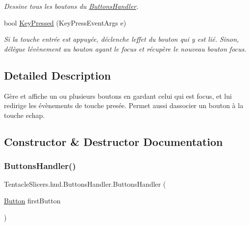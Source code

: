 \begin{DoxyCompactItemize}
\begin{DoxyCompactList}\small\item\em Dessine tous les boutons du \hyperlink{class_tentacle_slicers_1_1hud_1_1_buttons_handler}{Buttons\+Handler}. \end{DoxyCompactList}\item 
bool \hyperlink{class_tentacle_slicers_1_1hud_1_1_buttons_handler_abab8bf40df88c7cd220d591425c151b5}{Key\+Pressed} (Key\+Press\+Event\+Args e)
\begin{DoxyCompactList}\small\item\em Si la touche entrée est appuyée, déclenche l\textquotesingle{}effet du bouton qui y est lié. Sinon, délègue l\textquotesingle{}évènement au bouton ayant le focus et récupère le nouveau bouton focus. \end{DoxyCompactList}\end{DoxyCompactItemize}


\subsection{Detailed Description}
Gère et affiche un ou plusieurs boutons en gardant celui qui est focus, et lui redirige les évènements de touche presée. Permet aussi d\textquotesingle{}associer un bouton à la touche echap. 



\subsection{Constructor \& Destructor Documentation}
\mbox{\label{class_tentacle_slicers_1_1hud_1_1_buttons_handler_a9f5cc9dac18041a013f0bf37d88dee25}} 
\subsubsection{\texorpdfstring{Buttons\+Handler()}{ButtonsHandler()}}
{\footnotesize\ttfamily Tentacle\+Slicers.\+hud.\+Buttons\+Handler.\+Buttons\+Handler (\begin{DoxyParamCaption}\item[{\hyperlink{class_tentacle_slicers_1_1hud_1_1_button}{Button}}]{first\+Button }\end{DoxyParamCaption})}



